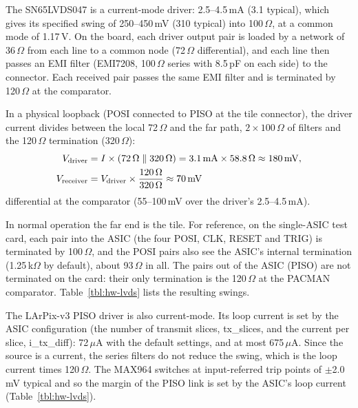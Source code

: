 \documentclass[12pt]{article}
\begin{document}
The SN65LVDS047 is a current-mode driver: 2.5--4.5\,mA (3.1 typical), which gives its specified
swing of 250--450\,mV (310 typical) into 100\,$\Omega$, at a common mode of 1.17\,V.  On the board,
each driver output pair is loaded by a network of 36\,$\Omega$ from each line to a common node
(72\,$\Omega$ differential), and each line then passes an EMI filter (EMI7208, 100\,$\Omega$ series
with 8.5\,pF on each side) to the connector.  Each received pair passes the same EMI filter and is
terminated by 120\,$\Omega$ at the comparator.

In a physical loopback (POSI connected to PISO at the tile connector), the driver current divides between
the local 72\,$\Omega$ and the far path, $2 \times 100\,\Omega$ of filters and the 120\,$\Omega$ termination
(320\,$\Omega$):
\begin{align*}
  V_{\rm driver} &= I \times (72\,\Omega \parallel 320\,\Omega) = 3.1\,{\rm mA} \times 58.8\,\Omega \approx 180\,{\rm mV}, \\
  V_{\rm receiver} &= V_{\rm driver} \times \frac{120\,\Omega}{320\,\Omega} \approx 70\,{\rm mV}
\end{align*}
differential at the comparator (55--100\,mV over the driver's 2.5--4.5\,mA).

In normal operation the far end is the tile.  For reference, on the single-ASIC test card, each pair
into the ASIC (the four POSI, CLK, RESET and TRIG) is terminated by 100\,$\Omega$, and the POSI
pairs also see the ASIC's internal termination (1.25\,k$\Omega$ by default), about 93\,$\Omega$ in
all.  The pairs out of the ASIC (PISO) are not terminated on the card: their only termination is the
120\,$\Omega$ at the PACMAN comparator.  Table~\ref{tbl:hw-lvds} lists the resulting swings.

The LArPix-v3 PISO driver is also current-mode.  Its loop current is set by the ASIC configuration (the
number of transmit slices, tx\_slices, and the current per slice, i\_tx\_diff):  72\,$\mu$A with the default
settings, and at most 675\,$\mu$A.  Since the source is a current, the series filters do not reduce the
swing, which is the loop current times 120\,$\Omega$.  The MAX964 switches at input-referred trip points of
$\pm$2.0\,mV typical and so the margin of the PISO link is set by the ASIC's loop current
(Table~\ref{tbl:hw-lvds}).
\end{document}

